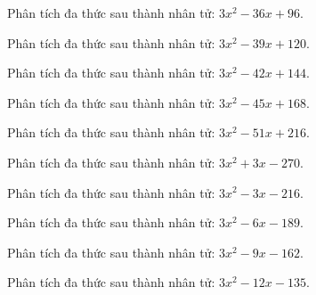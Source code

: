 \begin{bt}
	Phân tích đa thức sau thành nhân tử: $3 x^2 - 36 x + 96$.
\end{bt}
\begin{bt}
	Phân tích đa thức sau thành nhân tử: $3 x^2 - 39 x + 120$.
\end{bt}
\begin{bt}
	Phân tích đa thức sau thành nhân tử: $3 x^2 - 42 x + 144$.
\end{bt}
\begin{bt}
	Phân tích đa thức sau thành nhân tử: $3 x^2 - 45 x + 168$.
\end{bt}
\begin{bt}
	Phân tích đa thức sau thành nhân tử: $3 x^2 - 51 x + 216$.
\end{bt}
\begin{bt}
	Phân tích đa thức sau thành nhân tử: $3 x^2 + 3 x - 270$.
\end{bt}
\begin{bt}
	Phân tích đa thức sau thành nhân tử: $3 x^2 - 3 x - 216$.
\end{bt}
\begin{bt}
	Phân tích đa thức sau thành nhân tử: $3 x^2 - 6 x - 189$.
\end{bt}
\begin{bt}
	Phân tích đa thức sau thành nhân tử: $3 x^2 - 9 x - 162$.
\end{bt}
\begin{bt}
	Phân tích đa thức sau thành nhân tử: $3 x^2 - 12 x - 135$.
\end{bt}
